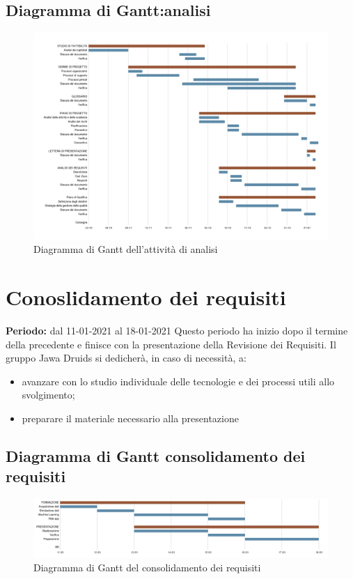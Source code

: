 \subsection{Diagramma di Gantt:analisi}\label{4.1.1}
\begin{figure}[!ht]
	\begin{center}
		\includegraphics[width=1\linewidth]{../immagini/gantt_analisi.png}
		\caption{Diagramma di Gantt dell'attività di analisi}
	\end{center}
\end{figure}

\section{Conoslidamento dei requisiti}\label{4.2}
\textbf{Periodo:} dal 11-01-2021 al 18-01-2021
Questo periodo ha inizio dopo il termine della precedente e finisce con la presentazione della Revisione dei Requisiti.
Il gruppo Jawa Druids si dedicherà, in caso di necessità, a:
\begin{itemize}
	\item avanzare con lo studio individuale delle tecnologie e dei processi utili allo svolgimento;
	\item preparare il materiale necessario alla presentazione
\end{itemize}
\subsection{Diagramma di Gantt consolidamento dei requisiti}\label{4.2.1}
\begin{figure}[!ht]
	\begin{center}
		\includegraphics[width=1\linewidth]{../immagini/gantt_consolidamento_requisiti.png}
		\caption{Diagramma di Gantt del consolidamento dei requisiti}
	\end{center}
\end{figure}
